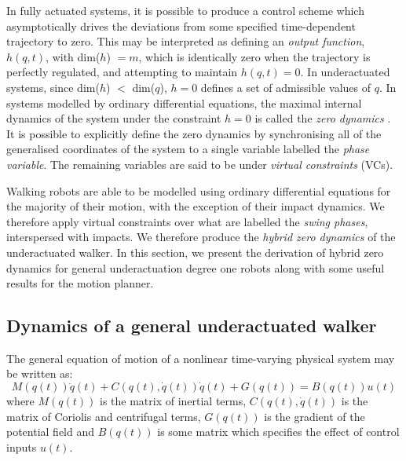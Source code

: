 In fully actuated systems, it is possible to produce a control scheme which asymptotically drives the deviations from some specified time-dependent trajectory to zero. This may be interpreted as defining an \textit{output function}, $h(q,t)$, with dim($h$) $= m$, which is identically zero when the trajectory is perfectly regulated, and attempting to maintain $h(q,t) = 0$. In underactuated systems, since dim($h$) $<$ dim($q$), $h = 0$ defines a set of admissible values of $q$. In systems modelled by ordinary differential equations, the maximal internal dynamics of the system under the constraint $h=0$ is called the \textit{zero dynamics} \cite{isidori1995nonlinear}. It is possible to explicitly define the zero dynamics by synchronising all of the generalised coordinates of the system to a single variable labelled the \textit{phase variable}. The remaining variables are said to be under \textit{virtual constraints} (VCs). %

Walking robots are able to be modelled using ordinary differential equations for the majority of their motion, with the exception of their impact dynamics. We therefore apply virtual constraints over what are labelled the \textit{swing phases}, interspersed with impacts. We therefore produce the \textit{hybrid zero dynamics} of the underactuated walker. In this section, we present the derivation of hybrid zero dynamics for general underactuation degree one robots along with some useful results for the motion planner.

\subsection{Dynamics of a general underactuated walker}
The general equation of motion of a nonlinear time-varying physical system may be written as:
\begin{equation}\label{eqn:dynamics}
	M\left(q(t)\right)\ddot{q}(t) + C\left(q(t),\dot{q}(t)\right)\dot{q}(t)
	 + G\left(q(t)\right) = B\left(q(t)\right)u(t)
\end{equation}
where $M\left(q(t)\right)$ is the matrix of inertial terms, $C\left(q(t),\dot{q}(t)\right)$ is the matrix of Coriolis and centrifugal terms, $G\left(q(t)\right)$ is the gradient of the potential field and $B\left(q(t)\right)$ is some matrix which specifies the effect of control inputs $u(t)$. 

